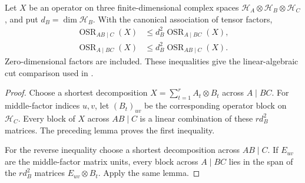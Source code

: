 \begin{theorem}
    \label{thm:operator_schmidt_cut_movement}
    \leanok
    Let $X$ be an operator on three finite-dimensional complex spaces
    $\mathcal H_A\otimes\mathcal H_B\otimes\mathcal H_C$, and put
    $d_B=\dim\mathcal H_B$. With the canonical association of tensor factors,
    \begin{align*}
        \operatorname{OSR}_{AB\mid C}(X)
            &\le d_B^2\operatorname{OSR}_{A\mid BC}(X), \\
        \operatorname{OSR}_{A\mid BC}(X)
            &\le d_B^2\operatorname{OSR}_{AB\mid C}(X).
    \end{align*}
    Zero-dimensional factors are included. These inequalities give the
    linear-algebraic cut comparison used in
    \cite[Lemma~4.2]{Arad2013AreaLaw}.
\end{theorem}
\begin{proof}
    \leanok
    Choose a shortest decomposition $X=\sum_{t=1}^{r}A_t\otimes B_t$ across
    $A\mid BC$. For middle-factor indices $u,v$, let $(B_t)_{uv}$ be the
    corresponding operator block on $\mathcal H_C$. Every block of $X$
    across $AB\mid C$ is a linear combination of these $r d_B^2$ matrices.
    The preceding lemma proves the first inequality.

    For the reverse inequality choose a shortest decomposition across
    $AB\mid C$. If $E_{uv}$ are the middle-factor matrix units, every block
    across $A\mid BC$ lies in the span of the $r d_B^2$ matrices
    $E_{uv}\otimes B_t$. Apply the same lemma.
\end{proof}

